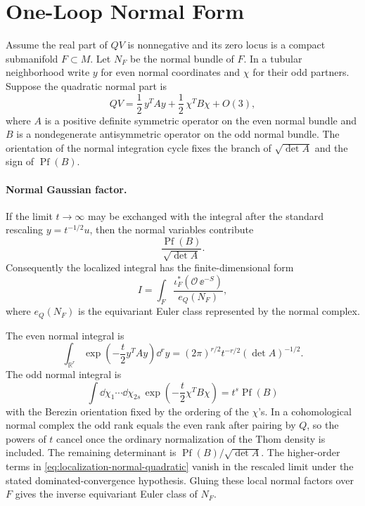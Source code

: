 \section{One-Loop Normal Form}

Assume the real part of \(QV\) is nonnegative and its zero locus is a compact
submanifold \(F\subset M\).  Let \(N_F\) be the normal bundle of \(F\).  In a
tubular neighborhood write \(y\) for even normal coordinates and
\(\chi\) for their odd partners.  Suppose the quadratic normal part is
\begin{equation}
  QV
  =
  \frac12\,y^T A y+\frac12\,\chi^T B\chi+O(3),
  \label{eq:localization-normal-quadratic}
\end{equation}
where \(A\) is a positive definite symmetric operator on the even normal
bundle and \(B\) is a nondegenerate antisymmetric operator on the odd normal
bundle.  The orientation of the normal integration cycle fixes the branch of
\(\sqrt{\det A}\) and the sign of \(\operatorname{Pf}(B)\).

\paragraph{Normal Gaussian factor.}
If the limit \(t\to\infty\) may be exchanged with the integral after the
standard rescaling \(y=t^{-1/2}u\), then the normal variables contribute
\[
  \frac{\operatorname{Pf}(B)}{\sqrt{\det A}} .
\]
Consequently the localized integral has the finite-dimensional form
\[
  I
  =
  \int_F
  \frac{\iota_F^*(\mathcal O\,\ee^{-S})}
  {e_Q(N_F)},
\]
where \(e_Q(N_F)\) is the equivariant Euler class represented by the normal
complex.

The even normal integral is
\[
  \int_{\mathbb R^r}
  \exp\!\left(-\frac{t}{2}y^TAy\right)\dd^r y
  =
  (2\pi)^{r/2}t^{-r/2}(\det A)^{-1/2}.
\]
The odd normal integral is
\[
  \int \dd\chi_1\cdots\dd\chi_{2s}\,
  \exp\!\left(-\frac{t}{2}\chi^TB\chi\right)
  =
  t^s\operatorname{Pf}(B)
\]
with the Berezin orientation fixed by the ordering of the \(\chi\)'s.  In a
cohomological normal complex the odd rank equals the even rank after pairing
by \(Q\), so the powers of \(t\) cancel once the ordinary normalization of
the Thom density is included.  The remaining determinant is
\(\operatorname{Pf}(B)/\sqrt{\det A}\).  The higher-order terms in
\eqref{eq:localization-normal-quadratic} vanish in the rescaled limit under
the stated dominated-convergence hypothesis.  Gluing these local normal
factors over \(F\) gives the inverse equivariant Euler class of \(N_F\).

